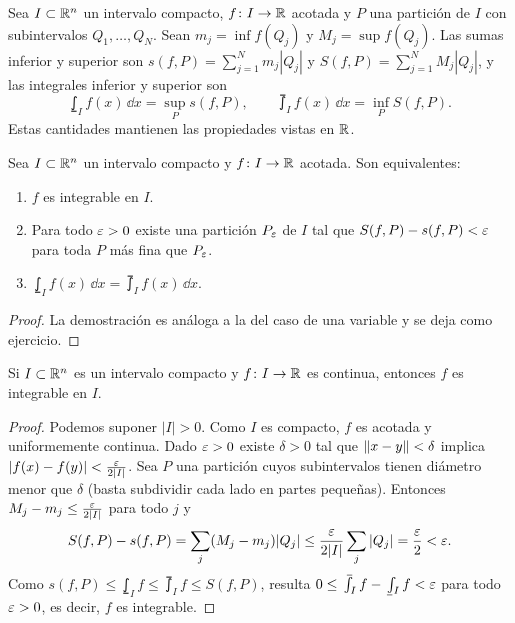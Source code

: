 \begin{definition}
  Sea \(I \subset \mathbb{R}^n\) un intervalo compacto, \(f\colon I \to \mathbb{R}\) acotada y \(P\) una partición de \(I\) con subintervalos \(Q_1, \dots, Q_N\). Sean \(m_j = \inf f(Q_j)\) y \(M_j = \sup f(Q_j)\). Las sumas inferior y superior son \(s(f, P) = \sum_{j=1}^{N} m_j |Q_j|\) y \(S(f, P) = \sum_{j=1}^{N} M_j |Q_j|\), y las integrales inferior y superior son
  \[
    \lowint_I f(x) \,\dd x = \sup_P s(f, P), \qquad \upint_I f(x) \,\dd x = \inf_P S(f, P).
  \]
  Estas cantidades mantienen las propiedades vistas en \(\mathbb{R}\).
\end{definition}

\begin{theorem}
  Sea \(I \subset \mathbb{R}^n\) un intervalo compacto y \(f\colon I \to \mathbb{R}\) acotada. Son equivalentes:
  \begin{enumerate}[label=(\arabic*)]
    \item \(f\) es integrable en \(I\).
    \item Para todo \(\varepsilon > 0\) existe una partición \(P_{\varepsilon}\) de \(I\) tal que \(S(f, P) - s(f, P) < \varepsilon\) para toda \(P\) más fina que \(P_{\varepsilon}\).
    \item \(\lowint_I f(x) \,\dd x = \upint_I f(x) \,\dd x\).
  \end{enumerate}
\end{theorem}

\begin{proof}
  La demostración es análoga a la del caso de una variable y se deja como ejercicio.
\end{proof}

\begin{prop}
  Si \(I \subset \mathbb{R}^n\) es un intervalo compacto y \(f\colon I \to \mathbb{R}\) es continua, entonces \(f\) es integrable en \(I\).
\end{prop}

\begin{proof}
  Podemos suponer \(|I| > 0\). Como \(I\) es compacto, \(f\) es acotada y uniformemente continua. Dado \(\varepsilon > 0\) existe \(\delta > 0\) tal que \(\left\lVert x - y \right\rVert < \delta\) implica \(|f(x) - f(y)| < \frac{\varepsilon}{2|I|}\). Sea \(P\) una partición cuyos subintervalos tienen diámetro menor que \(\delta\) (basta subdividir cada lado en partes pequeñas). Entonces \(M_j - m_j \leq \frac{\varepsilon}{2|I|}\) para todo \(j\) y
  \[
    S(f, P) - s(f, P) = \sum_{j} (M_j - m_j) |Q_j| \leq \frac{\varepsilon}{2|I|} \sum_j |Q_j| = \frac{\varepsilon}{2} < \varepsilon.
  \]
  Como \(s(f, P) \leq \lowint_I f \leq \upint_I f \leq S(f, P)\), resulta \(0 \leq \upint_I f - \lowint_I f < \e\) para todo \(\varepsilon > 0\), es decir, \(f\) es integrable.
\end{proof}

